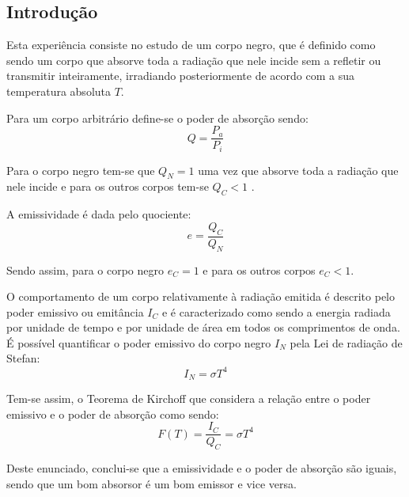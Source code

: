 \documentclass[9pt]{extarticle}
\begin{document}
\begin{multicols}{2}

\section{Introdução}

\par Esta experiência consiste no estudo de um corpo negro, que é definido como sendo um corpo que absorve toda a radiação que nele incide sem a refletir ou transmitir inteiramente, irradiando posteriormente de acordo com a sua temperatura absoluta $T$.

\par Para um corpo arbitrário define-se o poder de absorção sendo:
\begin{equation}
Q = \frac{P_a}{P_i}
\end{equation}
\begin{center}
\par{}
\end{center}
\par Para o corpo negro tem-se que $Q_N = 1$ uma vez que absorve toda a radiação que nele incide e para os outros corpos tem-se $Q_C < 1$ .
\par A emissividade é dada pelo quociente:
\begin{equation}
e = \frac{Q_C}{Q_N}
\end{equation}
\par Sendo assim, para o corpo negro $e_C = 1$ e para os outros corpos $e_C < 1$.

\par O comportamento de um corpo relativamente à radiação emitida é descrito pelo poder emissivo ou emitância $I_C$ e é caracterizado como sendo a energia radiada por unidade de tempo e por unidade de área em todos os comprimentos de onda. É possível quantificar o poder emissivo do corpo negro $I_N$ pela Lei de radiação de Stefan:
\begin{equation}
I_N = \sigma T^4
\end{equation}  
\begin{center}
\par{}
\end{center}

\par Tem-se assim, o Teorema de Kirchoff que considera a relação entre o poder emissivo e o poder de absorção como sendo:
\begin{equation}
F(T) = \frac{I_C}{Q_C} = \sigma T^4
\end{equation}
\par Deste enunciado, conclui-se que a emissividade e o poder de absorção são iguais, sendo que um bom absorsor é um bom emissor e vice versa.


\end{multicols}
\end{document}
